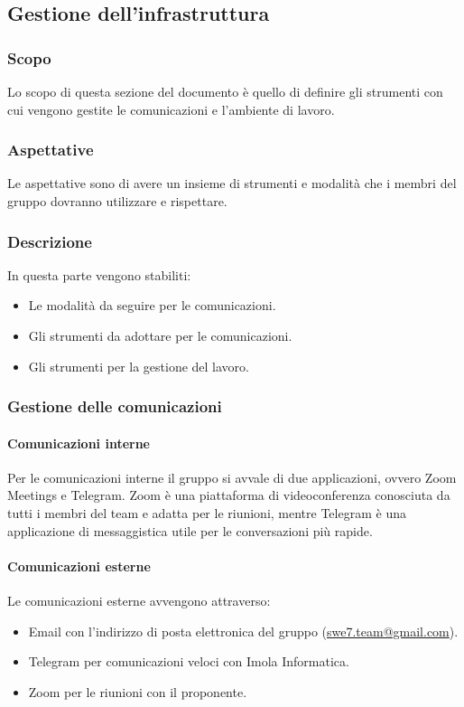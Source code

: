 \subsection{Gestione dell'infrastruttura}
\subsubsection{Scopo}
Lo scopo di questa sezione del documento è quello di definire gli strumenti con cui vengono gestite le comunicazioni e
l'ambiente di lavoro.

\subsubsection{Aspettative}
Le aspettative sono di avere un insieme di strumenti e modalità che i membri del gruppo dovranno utilizzare e rispettare.

\subsubsection{Descrizione}
In questa parte vengono stabiliti:
\begin{itemize}
    \item Le modalità da seguire per le comunicazioni.
    \item Gli strumenti da adottare per le comunicazioni.
    \item Gli strumenti per la gestione del lavoro.
\end{itemize}

\subsubsection{Gestione delle comunicazioni}
\paragraph{Comunicazioni interne}
Per le comunicazioni interne il gruppo si avvale di due applicazioni, ovvero Zoom Meetings e Telegram.
Zoom è una piattaforma di videoconferenza conosciuta da tutti i membri del team e adatta per le riunioni, mentre Telegram
è una applicazione di messaggistica utile per le conversazioni più rapide.

\paragraph{Comunicazioni esterne}
Le comunicazioni esterne avvengono attraverso:
\begin{itemize}
    \item Email con l'indirizzo di posta elettronica del gruppo (\href{mailto:swe7.team@gmail.com}{swe7.team@gmail.com}).
    \item Telegram per comunicazioni veloci con Imola Informatica.
    \item Zoom per le riunioni con il proponente.
\end{itemize}

